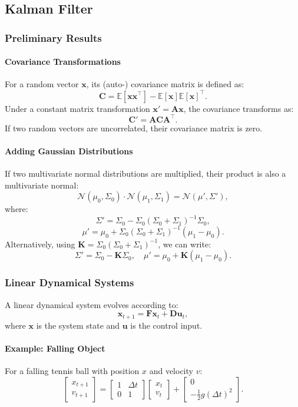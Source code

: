 \documentclass[12pt,a4paper]{article}
\begin{document}
\subsection{Kalman Filter}

\subsubsection{Preliminary Results}

\paragraph{Covariance Transformations}
For a random vector \( \mathbf{x} \), its (auto-) covariance matrix is defined as:
\[
\mathbf{C} = \mathbb{E}[\mathbf{xx}^\top] - \mathbb{E}[\mathbf{x}] \mathbb{E}[\mathbf{x}]^\top.
\]
Under a constant matrix transformation \( \mathbf{x}' = \mathbf{A}\mathbf{x} \), the covariance transforms as:
\[
\mathbf{C}' = \mathbf{A} \mathbf{C} \mathbf{A}^\top.
\]
If two random vectors are uncorrelated, their covariance matrix is zero.

\paragraph{Adding Gaussian Distributions}
If two multivariate normal distributions are multiplied, their product is also a multivariate normal:
\[
\mathcal{N}(\mu_0, \Sigma_0) \cdot \mathcal{N}(\mu_1, \Sigma_1) = \mathcal{N}(\mu', \Sigma'),
\]
where:
\[
\Sigma' = \Sigma_0 - \Sigma_0 (\Sigma_0 + \Sigma_1)^{-1} \Sigma_0,
\]
\[
\mu' = \mu_0 + \Sigma_0 (\Sigma_0 + \Sigma_1)^{-1} (\mu_1 - \mu_0).
\]
Alternatively, using \( \mathbf{K} = \Sigma_0 (\Sigma_0 + \Sigma_1)^{-1} \), we can write:
\[
\Sigma' = \Sigma_0 - \mathbf{K} \Sigma_0, \quad \mu' = \mu_0 + \mathbf{K} (\mu_1 - \mu_0).
\]

\subsubsection{Linear Dynamical Systems}
A linear dynamical system evolves according to:
\[
\mathbf{x}_{t+1} = \mathbf{F}\mathbf{x}_t + \mathbf{D}\mathbf{u}_t,
\]
where \( \mathbf{x} \) is the system state and \( \mathbf{u} \) is the control input.

\paragraph{Example: Falling Object}
For a falling tennis ball with position \( x \) and velocity \( v \):
\[
\begin{bmatrix}
x_{t+1} \\
v_{t+1}
\end{bmatrix}
=
\begin{bmatrix}
1 & \Delta t \\
0 & 1
\end{bmatrix}
\begin{bmatrix}
x_t \\
v_t
\end{bmatrix}
+
\begin{bmatrix}
0 \\
-\frac{1}{2}g(\Delta t)^2
\end{bmatrix}.
\]
\end{document}
